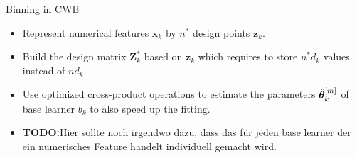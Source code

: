 \documentclass[t,10pt]{beamer}
\newcommand{\todo}{{\color{red}\textbf{TODO:}}\hspace{0.1cm}}
\begin{document}
\begin{frame}{Binning in CWB}
  \begin{itemize}
    \item
      Represent numerical features \(\bm{x}_k\) by \(n^\ast\) design points
      \(\bm{z}_k\).
    \item
      Build the design matrix \(\bm{Z}_k^\ast\) based on \(\bm{z}_k\) which
      requires to store \(n^\ast d_k\) values instead of \(nd_k\).
    \item
      Use optimized cross-product operations to estimate the parameters
      \(\hat{\bm{\theta}}_k^{[m]}\) of base learner \(b_k\) to also speed up the fitting.

    \item
      \todo Hier sollte noch irgendwo dazu, dass das für jeden base learner der ein numerisches Feature handelt individuell gemacht wird.
  \end{itemize}


\end{frame}
\end{document}
